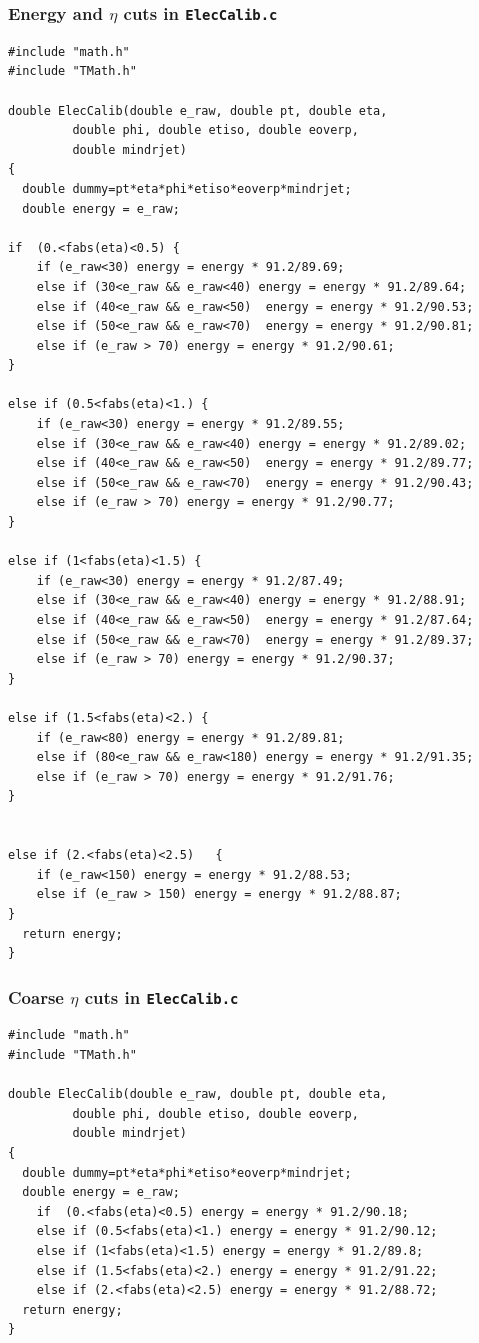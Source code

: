 \subsubsection{Energy and  $η$ cuts in \texttt{ElecCalib.c}}
\begin{lstlisting}
#include "math.h"
#include "TMath.h"

double ElecCalib(double e_raw, double pt, double eta,
		 double phi, double etiso, double eoverp,
		 double mindrjet)
{
  double dummy=pt*eta*phi*etiso*eoverp*mindrjet;
  double energy = e_raw;

if  (0.<fabs(eta)<0.5) {
	if (e_raw<30) energy = energy * 91.2/89.69;
	else if (30<e_raw && e_raw<40) energy = energy * 91.2/89.64;
	else if (40<e_raw && e_raw<50)  energy = energy * 91.2/90.53;
	else if (50<e_raw && e_raw<70)  energy = energy * 91.2/90.81;
	else if (e_raw > 70) energy = energy * 91.2/90.61;
}

else if (0.5<fabs(eta)<1.) {
	if (e_raw<30) energy = energy * 91.2/89.55;
	else if (30<e_raw && e_raw<40) energy = energy * 91.2/89.02;
	else if (40<e_raw && e_raw<50)  energy = energy * 91.2/89.77;
	else if (50<e_raw && e_raw<70)  energy = energy * 91.2/90.43;
	else if (e_raw > 70) energy = energy * 91.2/90.77;
}

else if (1<fabs(eta)<1.5) {
	if (e_raw<30) energy = energy * 91.2/87.49;
	else if (30<e_raw && e_raw<40) energy = energy * 91.2/88.91;
	else if (40<e_raw && e_raw<50)  energy = energy * 91.2/87.64;
	else if (50<e_raw && e_raw<70)  energy = energy * 91.2/89.37;
	else if (e_raw > 70) energy = energy * 91.2/90.37;
}

else if (1.5<fabs(eta)<2.) {
	if (e_raw<80) energy = energy * 91.2/89.81;
	else if (80<e_raw && e_raw<180) energy = energy * 91.2/91.35;
	else if (e_raw > 70) energy = energy * 91.2/91.76;
}


else if (2.<fabs(eta)<2.5)   {
	if (e_raw<150) energy = energy * 91.2/88.53;
	else if (e_raw > 150) energy = energy * 91.2/88.87;
}
  return energy;
}
\end{lstlisting}

\subsubsection{Coarse $η$ cuts in \texttt{ElecCalib.c}}
\begin{lstlisting}
#include "math.h"
#include "TMath.h"

double ElecCalib(double e_raw, double pt, double eta,
		 double phi, double etiso, double eoverp,
		 double mindrjet)
{
  double dummy=pt*eta*phi*etiso*eoverp*mindrjet;
  double energy = e_raw;
	if  (0.<fabs(eta)<0.5) energy = energy * 91.2/90.18;
    else if (0.5<fabs(eta)<1.) energy = energy * 91.2/90.12;
    else if (1<fabs(eta)<1.5) energy = energy * 91.2/89.8;
    else if (1.5<fabs(eta)<2.) energy = energy * 91.2/91.22;
    else if (2.<fabs(eta)<2.5) energy = energy * 91.2/88.72;
  return energy;
}
\end{lstlisting}

